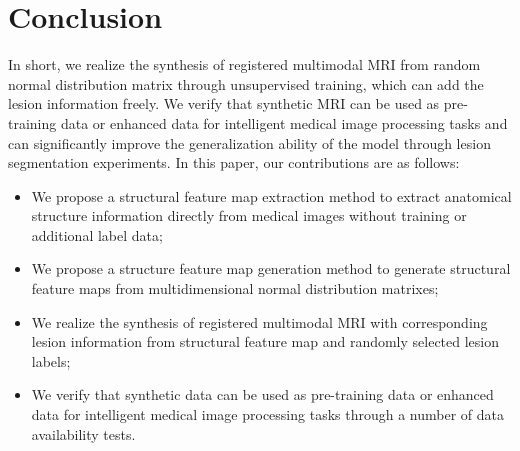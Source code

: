 \documentclass[letterpaper]{article} %
\begin{document}
%

\section{Conclusion}
In short, we realize the synthesis of registered multimodal MRI from random normal distribution matrix through unsupervised training, which can add the lesion information freely. 
We verify that synthetic MRI can be used as pre-training data or enhanced data for intelligent medical image processing tasks and can significantly improve the generalization ability of the model through lesion segmentation experiments.
In this paper, our contributions are as follows:
\begin{itemize}
	\item We propose a structural feature map extraction method to extract anatomical structure information directly from medical images without training or additional label data;
	\item We propose a structure feature map generation method to generate structural feature maps from multidimensional normal distribution matrixes;
	\item We realize the synthesis of registered multimodal MRI with corresponding lesion information from structural feature map and randomly selected lesion labels;
	\item We verify that synthetic data can be used as pre-training data or enhanced data for intelligent medical image processing tasks through a number of data availability tests.
	
\end{itemize}



\fontsize{9.0pt}{10.0pt}



\end{document}
